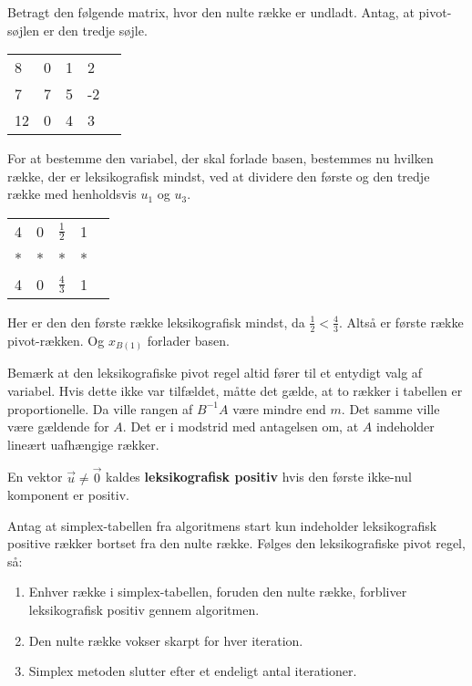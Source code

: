 \begin{eks}
Betragt den følgende matrix, hvor den nulte række er undladt. Antag, at pivot-søjlen er den tredje søjle. 

\begin{center}
\begin{tabular}{|l|llll|}
\hline
8  & 0 & 1 & 2  &  \\
7  & 7 & 5 & -2 &  \\
12 & 0 & 4 & 3  &  \\
\hline
\end{tabular}
\end{center}
For at bestemme den variabel, der skal forlade basen, bestemmes nu hvilken række, der er leksikografisk mindst, ved at dividere den første og den tredje række med henholdsvis $u_1$ og $u_3$.
\begin{center}
\begin{tabular}{|l|llll|}
\hline
4  & 0 & $\frac{1}{2}$ & 1  &  \\
*  & * & * & * &  \\
4 & 0 & $\frac{4}{3}$ & 1  &  \\
\hline
\end{tabular}
\end{center}
Her er den den første række leksikografisk mindst, da $\frac{1}{2}<\frac{4}{3}$.  Altså er første række pivot-rækken. Og $x_{B(1)}$ forlader basen. 
\end{eks}

Bemærk at den leksikografiske pivot regel altid fører til et entydigt valg af variabel. Hvis dette ikke var tilfældet, måtte det gælde, at to rækker i tabellen er proportionelle. Da ville rangen af $B^{-1}A$ være mindre end $m$. Det samme ville være gældende for $A$. Det er i modstrid med antagelsen om, at $A$ indeholder lineært uafhængige rækker. 

\begin{defn}
En vektor $\vec{u} \neq \vec{0}$ kaldes \textbf{leksikografisk positiv} hvis den første ikke-nul komponent er positiv. 
\end{defn}

 
\begin{stn}
Antag at simplex-tabellen fra algoritmens start kun indeholder leksikografisk positive rækker bortset fra den nulte række. Følges den leksikografiske pivot regel, så: 
\begin{enumerate}[label=(\alph*)]
\item Enhver række i simplex-tabellen, foruden den nulte række, forbliver leksikografisk positiv gennem algoritmen. 
\item Den nulte række vokser skarpt for hver iteration. 
\item Simplex metoden slutter efter et endeligt antal iterationer. 
\end{enumerate}
\label{stn:lexi}
\end{stn}

